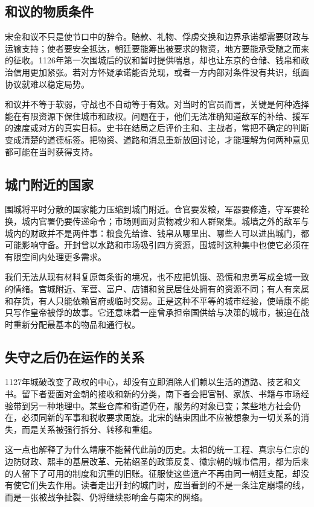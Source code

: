 \subsection{和议的物质条件}

宋金和议不只是使节口中的辞令。赔款、礼物、俘虏交换和边界承诺都需要财政与运输支持；使者要安全抵达，朝廷要能筹出被要求的物资，地方要能承受随之而来的征收。1126年第一次围城后的议和暂时提供喘息，却也让东京的仓储、钱帛和政治信用更加紧张。若对方怀疑承诺能否兑现，或者一方内部对条件没有共识，纸面协议就难以稳定局势。

和议并不等于软弱，守战也不自动等于有效。对当时的官员而言，关键是何种选择能在有限资源下保住城市和政权。问题在于，他们无法准确知道敌军的补给、援军的速度或对方的真实目标。史书在结局之后评价主和、主战者，常把不确定的判断变成清楚的道德标签。把物资、道路和消息重新放回讨论，才能理解为何两种意见都可能在当时获得支持。

\subsection{城门附近的国家}

围城将平时分散的国家能力压缩到城门附近。仓官要发粮，军器要修造，守军要轮换，城内官署仍要传递命令；市场则面对货物减少和人群聚集。城墙之外的敌军与城内的财政并不是两件事：粮食先给谁、钱帛从哪里出、哪些人可以进出城门，都可能影响守备。开封曾以水路和市场吸引四方资源，围城时这种集中也使它必须在有限空间内处理更多需求。

我们无法从现有材料复原每条街的境况，也不应把饥饿、恐慌和忠勇写成全城一致的情绪。宫城附近、军营、富户、店铺和贫民居住处拥有的资源不同；有人有亲属和存货，有人只能依赖官府或临时交易。正是这种不平等的城市经验，使靖康不能只写作皇帝被俘的故事。它还意味着一座曾承担帝国供给与决策的城市，被迫在战时重新分配最基本的物品和通行权。

\subsection{失守之后仍在运作的关系}

1127年城破改变了政权的中心，却没有立即消除人们赖以生活的道路、技艺和文书。留下者要面对金朝的接收和新的分类，南下者会把官制、家族、书籍与市场经验带到另一种地理中。某些仓库和街道仍在，服务的对象已变；某些地方社会仍在，必须同新的军事和税收要求周旋。北宋的结束因此不应被想象为一切关系的消失，而是关系被强行拆分、转移和重组。

这一点也解释了为什么靖康不能替代此前的历史。太祖的统一工程、真宗与仁宗的边防财政、熙丰的基层改革、元祐绍圣的政策反复、徽宗朝的城市信用，都为后来的人留下了可用的制度和沉重的旧账。征服使这些遗产不再由同一朝廷支配，却没有使它们失去作用。读者走出开封的城门时，应当看到的不是一条注定崩塌的线，而是一张被战争扯裂、仍将继续影响金与南宋的网络。

